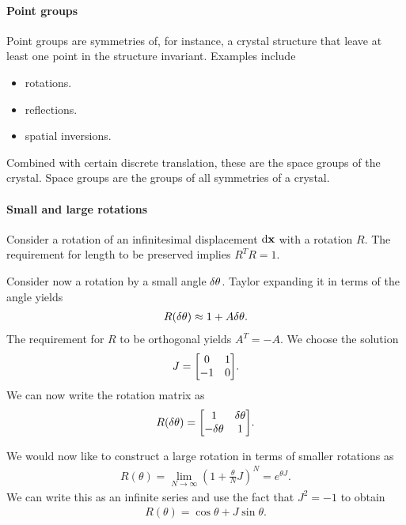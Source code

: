 \paragraph{Point groups}
Point groups are symmetries of, for instance, a crystal structure that leave at least one point in the structure invariant. Examples include
\begin{itemize}
	\item rotations.
	\item reflections.
	\item spatial inversions.
\end{itemize}
Combined with certain discrete translation, these are the space groups of the crystal. Space groups are the groups of all symmetries of a crystal.

\paragraph{Small and large rotations}
Consider a rotation of an infinitesimal displacement $\dd{\vb{x}}$ with a rotation $R$. The requirement for length to be preserved implies $R^{T}R = 1$.

Consider now a rotation by a small angle $\delta \theta$. Taylor expanding it in terms of the angle yields
\begin{align*}
	R(\delta \theta) \approx 1 + A\delta \theta.
\end{align*}
The requirement for $R$ to be orthogonal yields $A^{T} = -A$. We choose the solution
\begin{align*}
	J =
	\mqty[
		0  & 1 \\
		-1 & 0
	].
\end{align*}
We can now write the rotation matrix as
\begin{align*}
	R(\var{\theta}) =
	\mqty[
		1             & \var{\theta} \\
		-\var{\theta} & 1
	].
\end{align*}

We would now like to construct a large rotation in terms of smaller rotations as
\begin{align*}
	R(\theta) = \lim\limits_{N\to\infty}\left(1 + \frac{\theta}{N}J\right)^{N} = e^{\theta J}.
\end{align*}
We can write this as an infinite series and use the fact that $J^{2} = -1$ to obtain
\begin{align*}
	R(\theta) = \cos{\theta} + J\sin{\theta}.
\end{align*}

